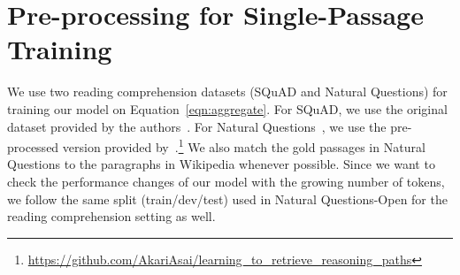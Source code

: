 \documentclass[11pt,a4paper]{article}
\begin{document}
\section{Pre-processing for Single-Passage Training}\label{apdx:prepro}
We use two reading comprehension datasets (SQuAD and Natural Questions) for training our model on Equation~\eqref{eqn:aggregate}.
For SQuAD, we use the original dataset provided by the authors~\citep{rajpurkar2016squad}.
For Natural Questions~\citep{kwiatkowski2019natural}, we use the pre-processed version provided by~\citet{asai2019learning}.\footnote{\url{https://github.com/AkariAsai/learning\_to\_retrieve\_reasoning\_paths}}
We also match the gold passages in Natural Questions to the paragraphs in Wikipedia whenever possible.
Since we want to check the performance changes of our model with the growing number of tokens, we follow the same split (train/dev/test) used in Natural Questions-Open for the reading comprehension setting as well.



\begin{table}[t]
\label{table:dataset}
\begin{center}
\centering
{}
\end{center}
\caption{Statistics of five open-domain QA datasets and two slot filling datasets. We follow the same splits in open-domain QA for the two reading comprehension datasets (SQuAD and Natural Questions).}\vspace{-0.3cm}\label{table:openqa-data}
\end{table}
 
\end{document}
